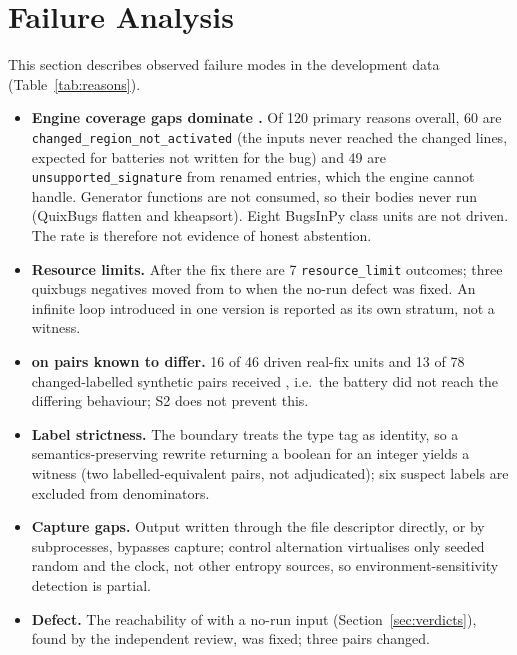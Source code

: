 \section{Failure Analysis}\label{sec:failure}
This section describes observed failure modes in the development data (Table~\ref{tab:reasons}).
\begin{itemize}
\item \textbf{Engine coverage gaps dominate \INS.} Of 120 \INS{} primary reasons overall, 60 are \texttt{changed\_region\_not\_activated} (the inputs never reached the changed lines, expected for batteries not written for the bug) and 49 are \texttt{unsupported\_signature} from renamed entries, which the engine cannot handle. Generator functions are not consumed, so their bodies never run (QuixBugs flatten and kheapsort). Eight BugsInPy class units are not driven. The \INS{} rate is therefore not evidence of honest abstention.
\item \textbf{Resource limits.} After the fix there are 7 \texttt{resource\_limit} outcomes; three quixbugs negatives moved from \NDO{} to \INS{} when the no-run defect was fixed. An infinite loop introduced in one version is reported as its own stratum, not a witness.
\item \textbf{\NDO{} on pairs known to differ.} 16 of 46 driven real-fix units and 13 of 78 changed-labelled synthetic pairs received \NDO, i.e.\ the battery did not reach the differing behaviour; S2 does not prevent this.
\item \textbf{Label strictness.} The boundary treats the type tag as identity, so a semantics-preserving rewrite returning a boolean for an integer yields a witness (two labelled-equivalent pairs, not adjudicated); six suspect labels are excluded from denominators.
\item \textbf{Capture gaps.} Output written through the file descriptor directly, or by subprocesses, bypasses capture; control alternation virtualises only seeded random and the clock, not other entropy sources, so environment-sensitivity detection is partial.
\item \textbf{Defect.} The reachability of \NDO{} with a no-run input (Section~\ref{sec:verdicts}), found by the independent review, was fixed; three pairs changed.
\end{itemize}

